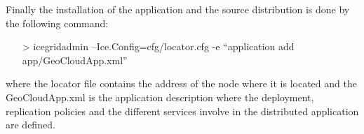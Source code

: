 Finally the installation of the application and the source distribution is done
by the following command:
\begin{itemize}
\item[>]icegridadmin --Ice.Config=cfg/locator.cfg -e ``application add
  app/GeoCloudApp.xml''
\end{itemize}

where the locator file contains the address of the node where it is located and
the GeoCloudApp.xml is the application description where the deployment,
replication policies and the different services involve in the distributed
application are defined.

